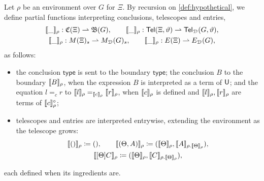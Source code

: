 \begin{definition}\label{def:interpretation-entries}
    Let $\rho$ be an environment over $G$ for $\Xi$. By recursion on \cref{def:hypothetical}, we define partial functions interpreting conclusions, telescopes and entries,
    \begin{gather*}
        \llbracket\_\rrbracket_\rho : \mathfrak{C}(\Xi) \rightharpoonup \mathfrak{B}(G), \qquad \llbracket\_\rrbracket_\rho : \mathsf{Tel}(\Xi, \vartheta) \rightharpoonup \mathsf{Tel}_{\mathcal{D}}(G, \vartheta),\\
        \llbracket\_\rrbracket_\rho : M(\Xi)_s \rightharpoonup M_{\mathcal{D}}(G)_s, \qquad \llbracket\_\rrbracket_\rho : E(\Xi) \rightharpoonup E_{\mathcal{D}}(G),
    \end{gather*}
    as follows:
    \begin{itemize}
        \item the conclusion $\mathsf{type}$ is sent to the boundary $\mathsf{type}$; the conclusion $B$ to the boundary $\llbracket B\rrbracket_\rho$, when the expression $B$ is interpreted as a term of $\mathsf{U}$; and the equation $l =_c r$ to $\llbracket l\rrbracket_\rho =_{\llbracket c\rrbracket_\rho} \llbracket r\rrbracket_\rho$, when $\llbracket c\rrbracket_\rho$ is defined and $\llbracket l\rrbracket_\rho, \llbracket r\rrbracket_\rho$ are terms of $\llbracket c\rrbracket_\rho^{\circ}$;
        \item telescopes and entries are interpreted entrywise, extending the environment as the telescope grows:
        \begin{gather*}
            \llbracket()\rrbracket_\rho \coloneqq (), \qquad \llbracket(\Theta, A)\rrbracket_\rho \coloneqq (\llbracket\Theta\rrbracket_\rho, \llbracket A\rrbracket_{\rho.\llbracket\Theta\rrbracket_\rho}),\\
            \llbracket[\Theta]C\rrbracket_\rho \coloneqq (\llbracket\Theta\rrbracket_\rho, \llbracket C\rrbracket_{\rho.\llbracket\Theta\rrbracket_\rho}),
        \end{gather*}
    \end{itemize}
    each defined when its ingredients are.
\end{definition}

